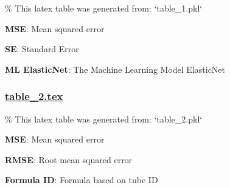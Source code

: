 \documentclass[11pt]{article}
\begin{document}
\begin{codeoutput}
\% This latex table was generated from: `table\_1.pkl`
\begin{table}[h]
\caption{Machine learning models performance comparison.}
\label{table:ML\_Model\_Performance}
\begin{threeparttable}
\renewcommand{\TPTminimum}{\linewidth}
\begin{tablenotes}
\footnotesize
\item \textbf{MSE}: Mean squared error
\item \textbf{SE}: Standard Error
\item \textbf{ML ElasticNet}: The Machine Learning Model ElasticNet
\end{tablenotes}
\end{threeparttable}
\end{table}
\end{codeoutput}

\subsubsection*{\hyperlink{code-LaTeX Table Design-table-2-tex}{table\_2.tex}}

\begin{codeoutput}
\% This latex table was generated from: `table\_2.pkl`
\begin{table}[h]
\caption{Formula based models performance comparison.}
\label{table:Formula\_Model\_Performance}
\begin{threeparttable}
\renewcommand{\TPTminimum}{\linewidth}
\begin{tablenotes}
\footnotesize
\item \textbf{MSE}: Mean squared error
\item \textbf{RMSE}: Root mean squared error
\item \textbf{Formula ID}: Formula based on tube ID
\end{tablenotes}
\end{threeparttable}
\end{table}
\end{codeoutput}
\end{document}

